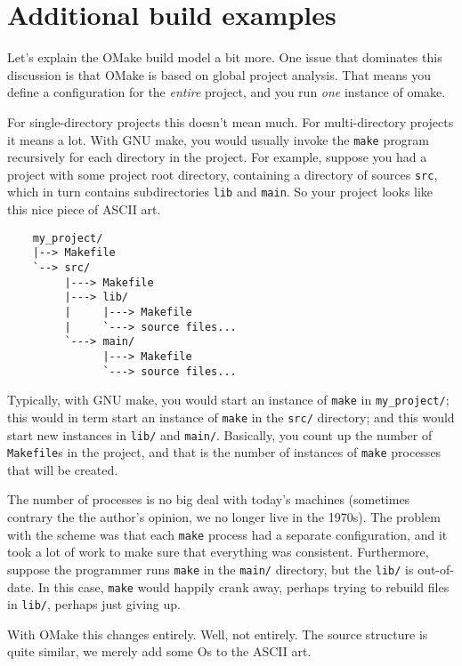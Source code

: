 %
%
%
\chapter{Additional build examples}
\label{chapter:build-examples}

Let's explain the OMake build model a bit more.
One issue that dominates this discussion is that OMake is based on global project analysis.  That
means you define a configuration for the \emph{entire} project, and you run \emph{one} instance of omake.

For single-directory projects this doesn't mean much.  For multi-directory projects it means a lot.
With GNU make, you would usually invoke the \verb+make+ program recursively for each directory in
the project.  For example, suppose you had a project with some project root directory, containing a
directory of sources \verb+src+, which in turn contains subdirectories \verb+lib+ and \verb+main+.
So your project looks like this nice piece of ASCII art.

\begin{verbatim}
    my_project/
    |--> Makefile
    `--> src/
         |---> Makefile
         |---> lib/
         |     |---> Makefile
         |     `---> source files...
         `---> main/
               |---> Makefile
               `---> source files...
\end{verbatim}
                    
Typically, with GNU make, you would start an instance of \verb+make+ in \verb+my_project/+; this
would in term start an instance of \verb+make+ in the \verb+src/+ directory; and this would start
new instances in \verb+lib/+ and \verb+main/+.  Basically, you count up the number of
\verb+Makefile+s in the project, and that is the number of instances of \verb+make+ processes that
will be created.

The number of processes is no big deal with today's machines (sometimes contrary the the author's opinion, we
no longer live in the 1970s).  The problem with the scheme was that each \verb+make+ process had a
separate configuration, and it took a lot of work to make sure that everything was consistent.
Furthermore, suppose the programmer runs \verb+make+ in the \verb+main/+ directory, but the
\verb+lib/+ is out-of-date.  In this case, \verb+make+ would happily crank away, perhaps trying to
rebuild files in \verb+lib/+, perhaps just giving up.

With OMake this changes entirely.  Well, not entirely.  The source structure is quite similar, we
merely add some Os to the ASCII art.

